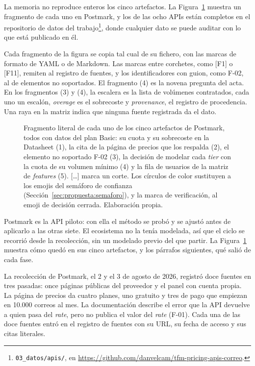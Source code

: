 La memoria no reproduce enteros los cinco artefactos.
La Figura~\ref{fig:propuesta:artefactos} muestra un fragmento de cada uno en Postmark, y los de las ocho APIs están completos en el repositorio de datos del trabajo\footnote{\texttt{03\_datos/\allowbreak apis/}, en \url{https://github.com/danvelcam/tfm-pricing-apis-correo}.}, donde cualquier dato se puede auditar con lo que está publicado en él.

Cada fragmento de la figura se copia tal cual de su fichero, con las marcas de formato de YAML o de Markdown.
Las marcas entre corchetes, como [F1] o [F11], remiten al registro de fuentes, y los identificadores con guion, como F-02, al de elementos no soportados.
El fragmento (4) es la novena pregunta del acta.
En los fragmentos (3) y (4), la escalera es la lista de volúmenes contratados, cada uno un escalón, \textit{overage} es el sobrecoste y \textit{provenance}, el registro de procedencia.
Una raya en la matriz indica que ninguna fuente registrada da el dato.

\begin{figure}[p]
\centering

\caption[Los cinco artefactos de Postmark]{Fragmento literal de cada uno de los cinco artefactos de Postmark, todos con datos del plan Basic: su cuota y su sobrecoste en la Datasheet (1), la cita de la página de precios que los respalda (2), el elemento no soportado F-02 (3), la decisión de modelar cada \textit{tier} con la cuota de su volumen mínimo (4) y la fila de usuarios de la matriz de \textit{features} (5). [\ldots] marca un corte. Los círculos de color sustituyen a los emojis del semáforo de confianza (Sección~\ref{sec:propuesta:semaforo}), y la marca de verificación, al emoji de decisión cerrada. Elaboración propia.}
\label{fig:propuesta:artefactos}
\end{figure}

\label{sec:propuesta:piloto}
Postmark \citep{postmarkpricing} es la API piloto: con ella el método se probó y se ajustó antes de aplicarlo a las otras siete.
El ecosistema no la tenía modelada, así que el ciclo se recorrió desde la recolección, sin un modelado previo del que partir.
La Figura~\ref{fig:propuesta:artefactos} muestra cómo quedó en sus cinco artefactos, y los párrafos siguientes, qué salió de cada fase.

La recolección de Postmark, el 2 y el 3 de agosto de 2026, registró doce fuentes en tres pasadas: once páginas públicas del proveedor y el panel con cuenta propia.
La página de precios da cuatro planes, uno gratuito y tres de pago que empiezan en 10.000 correos al mes.
La documentación describe el error que la API devuelve a quien pasa del \textit{rate}, pero no publica el valor del \textit{rate} (F-01).
Cada una de las doce fuentes entró en el registro de fuentes con su URL, su fecha de acceso y sus citas literales.


